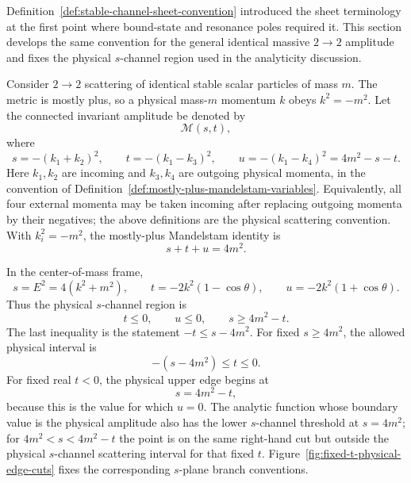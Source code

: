 Definition~\ref{def:stable-channel-sheet-convention} introduced the sheet
terminology at the first point where bound-state and resonance poles required
it.  This section develops the same convention for the general identical
massive \(2\to2\) amplitude and fixes the physical \(s\)-channel region used
in the analyticity discussion.

Consider \(2\to2\) scattering of identical stable scalar particles of mass
\(m\).  The metric is mostly plus, so a physical mass-\(m\) momentum \(k\)
obeys \(k^2=-m^2\).  Let the connected invariant amplitude be denoted by
\[
  \mathcal M(s,t),
\]
where
\[
  s=-(k_1+k_2)^2,\qquad
  t=-(k_1-k_3)^2,\qquad
  u=-(k_1-k_4)^2=4m^2-s-t .
\]
Here \(k_1,k_2\) are incoming and \(k_3,k_4\) are outgoing physical
momenta, in the convention of
Definition~\ref{def:mostly-plus-mandelstam-variables}.  Equivalently, all four
external momenta may be taken incoming after
replacing outgoing momenta by their negatives; the above definitions are the
physical scattering convention.  With \(k_i^2=-m^2\), the mostly-plus
Mandelstam identity is
\[
  s+t+u=4m^2 .
\]

In the center-of-mass frame,
\[
  s=E^2=4(k^2+m^2),
  \qquad
  t=-2k^2(1-\cos\theta),
  \qquad
  u=-2k^2(1+\cos\theta).
\]
Thus the physical \(s\)-channel region is
\[
  t\le0,\qquad
  u\le0,\qquad
  s\ge4m^2-t .
\]
The last inequality is the statement \(-t\le s-4m^2\).  For fixed
\(s\ge4m^2\), the allowed physical interval is
\[
  -(s-4m^2)\le t\le0 .
\]
For fixed real \(t<0\), the physical upper edge begins at
\[
  s=4m^2-t,
\]
because this is the value for which \(u=0\).  The analytic function whose
boundary value is the physical amplitude also has the lower \(s\)-channel
threshold at \(s=4m^2\); for \(4m^2<s<4m^2-t\) the point is on the same
right-hand cut but outside the physical \(s\)-channel scattering interval for
that fixed \(t\).  Figure~\ref{fig:fixed-t-physical-edge-cuts} fixes the
corresponding \(s\)-plane branch conventions.

